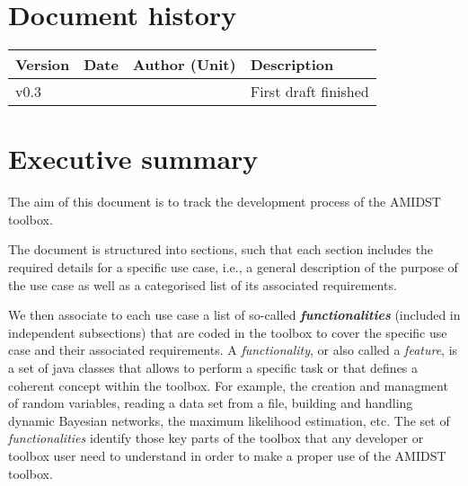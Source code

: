 \documentclass[11pt, oneside]{article}   	%
\begin{document}
%

%
%



\tableofcontents

\newpage


\section*{Document history}

\begin{table}[htbp]
  \centering
  \begin{tabularx}{\linewidth}{|p{17mm}|p{17mm}|X|X|}\hline
    {\bf Version} & {\bf Date} & {\bf Author (Unit)} & {\bf Description} \\ \hline \hline
    v0.3 &  &  & First draft finished  \\ 
\hline
  \end{tabularx}
\end{table}

\newpage



\section*{Executive summary}
\label{sec:summary}

The aim of this document is to track the development process of the AMIDST toolbox. 

The document is structured into sections, such that each section includes the required details for a specific use case, i.e., a general description of the purpose of the use case as well as a categorised list of its associated requirements.

We then associate to each use case a list of so-called \textit{\textbf{functionalities}} (included in independent subsections) that are coded in the toolbox to cover the specific use case and their associated requirements. A \textit{functionality}, or also called a \textit{feature}, is a set of java classes that allows to perform a specific task or that defines a coherent concept within the toolbox. For example, the creation and managment of random variables, reading a data set from a file, building and handling dynamic Bayesian networks, the maximum likelihood estimation, etc. The set of \textit{functionalities} identify those key parts of the toolbox that any developer or toolbox user need to understand in order to make a proper use of the AMIDST toolbox.
\end{document}
